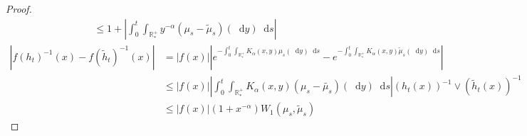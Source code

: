 \documentclass[11pt,a4paper]{article}
\newcommand{\RRP}{\mathbb{R}^+_*}
\newcommand{\dd}{\mathop{}\!\mathrm{d}}
\begin{document}
\begin{proof}
\begin{multline*}
        \leq 1 + \left| \int_0^t \int_{\RRP} y^{-\alpha}  (\mu_s-\tilde{\mu}_s)(\dd y) \dd s \right|
    \end{multline*}
    \begin{align*}
        \left|f(h_t)^{-1}(x) - f(\tilde{h}_t)^{-1}(x)\right| 
        &= |f(x)| \left|e^{-\int_0^t\int_{\RRP} K_\alpha(x,y) \mu_s (\dd y)\dd s} - e^{-\int_0^t\int_{\RRP} K_\alpha(x,y) \tilde{\mu}_s (\dd y)\dd s}\right|\\
        &\leq |f(x)|\left|\int_0^t\int_{\RRP} K_\alpha(x,y) (\mu_s - \tilde{\mu_s})(\dd y)\dd s \right|(h_t(x))^{-1} \vee (\tilde{h}_t(x))^{-1} \\
        &\leq |f(x)|(1 + x^{-\alpha})W_1(\mu_s,\tilde{\mu}_s) 
    \end{align*}
\end{proof}
\end{document}
